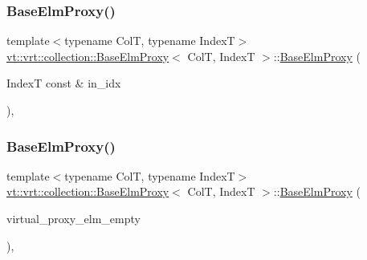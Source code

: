 \subsubsection{\texorpdfstring{Base\+Elm\+Proxy()}{BaseElmProxy()}\hspace{0.1cm}{\footnotesize\ttfamily [1/5]}}
{\footnotesize\ttfamily template$<$typename ColT, typename IndexT$>$ \\
\hyperlink{structvt_1_1vrt_1_1collection_1_1_base_elm_proxy}{vt\+::vrt\+::collection\+::\+Base\+Elm\+Proxy}$<$ ColT, IndexT $>$\+::\hyperlink{structvt_1_1vrt_1_1collection_1_1_base_elm_proxy}{Base\+Elm\+Proxy} (\begin{DoxyParamCaption}\item[{IndexT const \&}]{in\+\_\+idx }\end{DoxyParamCaption})\hspace{0.3cm}{\ttfamily [inline]}, {\ttfamily [explicit]}}

\mbox{\label{structvt_1_1vrt_1_1collection_1_1_base_elm_proxy_ab6419a69aa754dfc38c6a3c779765b1a}} 
\subsubsection{\texorpdfstring{Base\+Elm\+Proxy()}{BaseElmProxy()}\hspace{0.1cm}{\footnotesize\ttfamily [2/5]}}
{\footnotesize\ttfamily template$<$typename ColT, typename IndexT$>$ \\
\hyperlink{structvt_1_1vrt_1_1collection_1_1_base_elm_proxy}{vt\+::vrt\+::collection\+::\+Base\+Elm\+Proxy}$<$ ColT, IndexT $>$\+::\hyperlink{structvt_1_1vrt_1_1collection_1_1_base_elm_proxy}{Base\+Elm\+Proxy} (\begin{DoxyParamCaption}\item[{virtual\+\_\+proxy\+\_\+elm\+\_\+empty}]{ }\end{DoxyParamCaption})\hspace{0.3cm}{\ttfamily [inline]}, {\ttfamily [explicit]}}

\mbox{\label{structvt_1_1vrt_1_1collection_1_1_base_elm_proxy_ad57eaf8904028e67f2ef719b055686fc}} 
